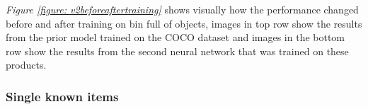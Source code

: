 \textit{Figure \ref{figure: v2beforeaftertraining}} shows visually how the performance changed before and after training on bin full of objects, images in top row show the results from the prior model trained on the COCO dataset and images in the bottom row show the results from the second neural network that was trained on these products.

\clearpage
\subsubsection{Single known items} \label{sec:v2resontrained}
\begin{figure}[h]
 \centering
 \hfill
 \hfill

\end{figure}
